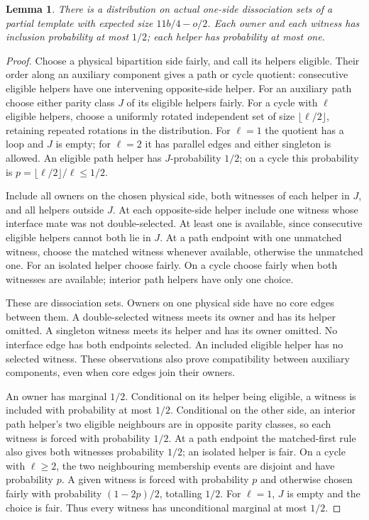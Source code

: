 \documentclass[11pt]{article}
\newtheorem{lemma}[theorem]{Lemma}
\begin{document}
\begin{lemma}\label{lem:balanced-side}
There is a distribution on actual one-side dissociation sets of a partial
 template with expected size $11b/4-o/2$. Each owner and each witness has
 inclusion probability at most $1/2$; each helper has probability at most one.
\end{lemma}
\begin{proof}
Choose a physical bipartition side fairly, and call its helpers eligible.
Their order along an auxiliary component gives a path or cycle quotient:
consecutive eligible helpers have one intervening opposite-side helper.
For an auxiliary path choose either parity class $J$ of its eligible
helpers fairly. For a cycle with $\ell$ eligible helpers, choose a uniformly
rotated independent set of size $\lfloor\ell/2\rfloor$, retaining repeated
rotations in the distribution. For $\ell=1$ the quotient has a loop and
$J$ is empty; for $\ell=2$ it has parallel edges and either singleton
is allowed. An eligible path helper has $J$-probability $1/2$; on a cycle
this probability is $p=\lfloor\ell/2\rfloor/\ell\le1/2$.

Include all owners on the chosen physical side, both witnesses of each
helper in $J$, and all helpers outside $J$. At each opposite-side helper
include one witness whose interface mate was not double-selected.
At least one is available, since consecutive eligible helpers cannot
both lie in $J$. At a path endpoint with one unmatched witness, choose
the matched witness whenever available, otherwise the unmatched one.
For an isolated helper choose fairly. On a cycle choose fairly when
both witnesses are available; interior path helpers have only one choice.

These are dissociation sets. Owners on one physical side have no core
edges between them. A double-selected witness meets its owner and has
its helper omitted. A singleton witness meets its helper and has its
owner omitted. No interface edge has both endpoints selected. An included
eligible helper has no selected witness. These observations also prove
compatibility between auxiliary components, even when core edges join
their owners.

An owner has marginal $1/2$. Conditional on its helper being eligible,
a witness is included with probability at most $1/2$. Conditional on
the other side, an interior path helper's two eligible neighbours are
in opposite parity classes, so each witness is forced with probability
$1/2$. At a path endpoint the matched-first rule also gives both
witnesses probability $1/2$; an isolated helper is fair. On a cycle
with $\ell\ge2$, the two neighbouring membership events are disjoint
and have probability $p$. A given witness is forced with probability
$p$ and otherwise chosen fairly with probability $(1-2p)/2$, totalling
$1/2$. For $\ell=1$, $J$ is empty and the choice is fair. Thus every
witness has unconditional marginal at most $1/2$.


\end{proof}
\end{document}
